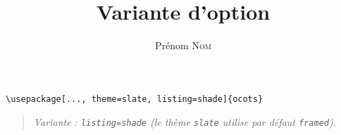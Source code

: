 \documentclass[11pt]{ocots-book}
\title{Variante d'option}
\author{Prénom \textsc{Nom}}
\newcommand{\ocotsvariantnote}[1]{\begin{quote}\itshape Variante : #1\end{quote}}
\begin{document}
\maketitle

\begin{lstlisting}
\usepackage[..., theme=slate, listing=shade]{ocots}
\end{lstlisting}
\ocotsvariantnote{\texttt{listing=shade} (le th\`eme \texttt{slate} utilise par d\'efaut \texttt{framed}).}

\end{document}
